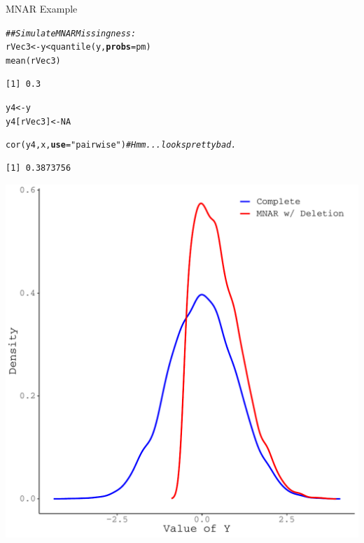 \documentclass{beamer}\usepackage[]{graphicx}\usepackage[]{color}
\makeatletter
\newcommand{\hlnum}[1]{\textcolor[rgb]{0.69,0.494,0}{#1}}%
\newcommand{\hlstr}[1]{\textcolor[rgb]{0.749,0.012,0.012}{#1}}%
\newcommand{\hlcom}[1]{\textcolor[rgb]{0.514,0.506,0.514}{\textit{#1}}}%
\newcommand{\hlopt}[1]{\textcolor[rgb]{0,0,0}{#1}}%
\newcommand{\hlstd}[1]{\textcolor[rgb]{0,0,0}{#1}}%
\newcommand{\hlkwb}[1]{\textcolor[rgb]{0,0.341,0.682}{#1}}%
\newcommand{\hlkwc}[1]{\textcolor[rgb]{0,0,0}{\textbf{#1}}}%
\newcommand{\hlkwd}[1]{\textcolor[rgb]{0.004,0.004,0.506}{#1}}%
\newenvironment{kframe}{%
 \def\at@end@of@kframe{}%
 \ifinner\ifhmode%
  \def\at@end@of@kframe{\end{minipage}}%
  \begin{minipage}{\columnwidth}%
 \fi\fi%
 \def\FrameCommand##1{\hskip\@totalleftmargin \hskip-\fboxsep
 \colorbox{shadecolor}{##1}\hskip-\fboxsep
     \hskip-\linewidth \hskip-\@totalleftmargin \hskip\columnwidth}%
 \MakeFramed {\advance\hsize-\width
   \@totalleftmargin\z@ \linewidth\hsize
   \@setminipage}}%
 {\par\unskip\endMakeFramed%
 \at@end@of@kframe}
\newenvironment{knitrout}{}{} %
\makeatother
\begin{document}

\begin{frame}{MNAR Example}
  
\begin{knitrout}\footnotesize
{}\color{fgcolor}\begin{kframe}
\begin{alltt}
\hlcom{## Simulate MNAR Missingness:}
\hlstd{rVec3} \hlkwb{<-} \hlstd{y} \hlopt{<} \hlkwd{quantile}\hlstd{(y,} \hlkwc{probs} \hlstd{= pm)}
\hlkwd{mean}\hlstd{(rVec3)}
\end{alltt}
\begin{verbatim}
[1] 0.3
\end{verbatim}
\begin{alltt}
\hlstd{y4} \hlkwb{<-} \hlstd{y}
\hlstd{y4[rVec3]} \hlkwb{<-} \hlnum{NA}

\hlkwd{cor}\hlstd{(y4, x,} \hlkwc{use} \hlstd{=} \hlstr{"pairwise"}\hlstd{)} \hlcom{# Hmm...looks pretty bad.}
\end{alltt}
\begin{verbatim}
[1] 0.3873756
\end{verbatim}
\end{kframe}
\end{knitrout}

\pagebreak

\begin{knitrout}\footnotesize
{}\color{fgcolor}

{\centering \includegraphics[width=0.65\linewidth]{figure/intro-unnamed-chunk-16-1} 

}


\end{knitrout}

\end{frame}
\end{document}
